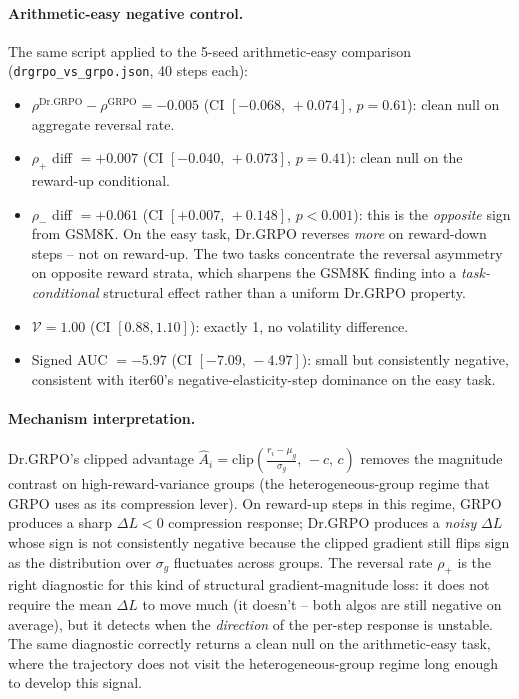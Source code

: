 \documentclass{article}
\begin{document}
\paragraph{Arithmetic-easy negative control.}
The same script applied to the 5-seed arithmetic-easy comparison
(\texttt{drgrpo\_vs\_grpo.json}, 40 steps each):
\begin{itemize}
\item $\rho^{\mathrm{Dr.GRPO}} - \rho^{\mathrm{GRPO}} = -0.005$
      (CI $[-0.068,\, +0.074]$, $p = 0.61$): clean null on aggregate
      reversal rate.
\item $\rho_{+}$ diff $= +0.007$ (CI $[-0.040,\, +0.073]$, $p = 0.41$):
      clean null on the reward-up conditional.
\item $\rho_{-}$ diff $= +0.061$ (CI $[+0.007,\, +0.148]$, $p < 0.001$):
      this is the \emph{opposite} sign from GSM8K. On the easy task,
      Dr.GRPO reverses \emph{more} on reward-down steps -- not on
      reward-up. The two tasks concentrate the reversal asymmetry on
      opposite reward strata, which sharpens the GSM8K finding into a
      \emph{task-conditional} structural effect rather than a uniform
      Dr.GRPO property.
\item $\mathcal{V} = 1.00$ (CI $[0.88, 1.10]$): exactly 1, no
      volatility difference.
\item Signed AUC $= -5.97$ (CI $[-7.09,\, -4.97]$): small but
      consistently negative, consistent with iter60's
      negative-elasticity-step dominance on the easy task.
\end{itemize}

\paragraph{Mechanism interpretation.}
Dr.GRPO's clipped advantage $\hat A_i = \mathrm{clip}\!\left(\frac{r_i -
\mu_g}{\sigma_g},\, -c,\, c\right)$ removes the magnitude contrast on
high-reward-variance groups (the heterogeneous-group regime that GRPO
uses as its compression lever). On reward-up steps in this regime,
GRPO produces a sharp $\Delta L < 0$ compression response; Dr.GRPO
produces a \emph{noisy} $\Delta L$ whose sign is not consistently
negative because the clipped gradient still flips sign as the
distribution over $\sigma_g$ fluctuates across groups. The reversal
rate $\rho_+$ is the right diagnostic for this kind of structural
gradient-magnitude loss: it does not require the mean $\Delta L$ to
move much (it doesn't -- both algos are still negative on average),
but it detects when the \emph{direction} of the per-step response is
unstable. The same diagnostic correctly returns a clean null on the
arithmetic-easy task, where the trajectory does not visit the
heterogeneous-group regime long enough to develop this signal.
\end{document}
